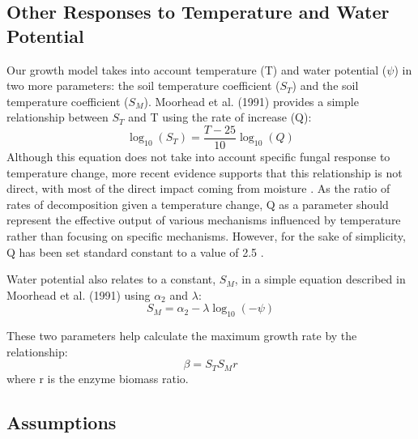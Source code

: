 \documentclass[12pt]{article}
\begin{document}
\begin{multicols}{2}
	
\subsection{Other Responses to Temperature and Water Potential}

Our growth model takes into account temperature (T) and water potential ($\psi$) in two more parameters: the soil temperature coefficient ($S_T$) and the soil temperature coefficient ($S_M$). Moorhead et al. (1991) provides a simple relationship between $S_T$ and T using the rate of increase (Q):
\begin{equation}
\log_{10}(S_T) = \frac{T-25}{10}\log_{10}(Q)
\end{equation}
Although this equation does not take into account specific fungal response to temperature change, more recent evidence supports that this relationship is not direct, with most of the direct impact coming from moisture \cite{Petraglia2018}. As the ratio of rates of decomposition given a temperature change, Q as a parameter should represent the effective output of various mechanisms influenced by temperature rather than focusing on specific mechanisms. However, for the sake of simplicity, Q has been set standard constant to a value of 2.5 \cite{Moorhead1991}.

Water potential also relates to a constant, $S_M$, in a simple equation described in Moorhead et al. (1991) using $\alpha_2$ and $\lambda$:
\begin{equation}
S_M = \alpha_2 -\lambda \log_{10}(-\psi)
\end{equation}

These two parameters help calculate the maximum growth rate by the relationship:
\begin{equation}
\beta = S_T S_M r
\end{equation}
where r is the enzyme biomass ratio.

\subsection{Assumptions}


\end{multicols}
\end{document}
